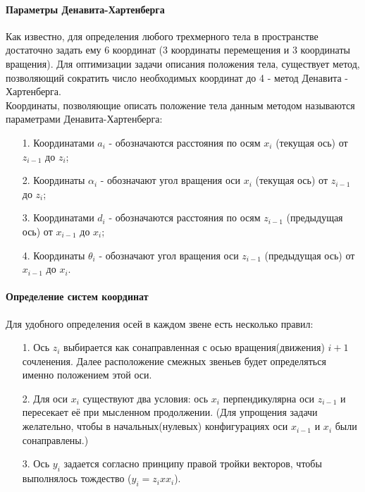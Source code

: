 \paragraph*{Параметры Денавита-Хартенберга\\}

\hspace*{\parindent}Как известно, для определения любого трехмерного тела в пространстве достаточно задать ему 6 координат (3 координаты перемещения и 3 координаты вращения). Для оптимизации задачи описания положения тела, существует метод, позволяющий сократить число необходимых координат до 4 - метод Денавита - Хартенберга.\\

\hspace*{\parindent}Координаты, позволяющие описать положение тела данным методом называются параметрами Денавита-Хартенберга:
\begin{enumerate} 
 \item[1.] Координатами $a_i$ - обозначаются расстояния по осям $x_i$ (текущая ось) от  $z_{i-1}$ до $z_i$;
 \item[2.] Координаты $\alpha_i$ - обозначают угол вращения оси $x_i$ (текущая ось) от  $z_{i-1}$ до $z_i$;
 \item[3.] Координатами $d_i$ - обозначаются расстояния по осям $z_{i-1}$ (предыдущая ось) от  $x_{i-1}$ до $x_i$;
 \item[4.] Координаты $\theta_i$ - обозначают угол вращения оси $z_{i-1}$ (предыдущая ось) от  $x_{i-1}$ до $x_i$.\\
 \end{enumerate}
 
 \paragraph*{Определение систем координат\\}
 
\hspace*{\parindent}Для удобного определения осей в каждом звене есть несколько правил:
\begin{enumerate} 
\item[1.] Ось $z_i$ выбирается как сонаправленная с осью вращения(движения) $i+1$ сочленения. Далее расположение смежных звеньев будет определяться именно положением этой оси.
\item[2.] Для оси $x_i$ существуют два условия: ось $x_i$ перпендикулярна оси $z_{i-1}$ и пересекает её при мысленном продолжении. (Для упрощения задачи желательно, чтобы в начальных(нулевых) конфигурациях оси $x_{i-1}$ и $x_i$ были сонаправлены.)
\item[3.] Ось $y_i$ задается согласно принципу правой тройки векторов, чтобы выполнялось тождество ($y_i = z_i x x_i$).
 \end{enumerate}

